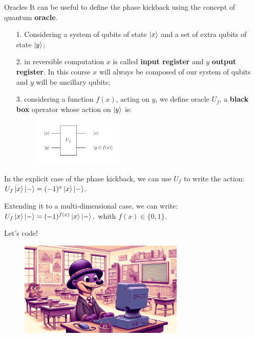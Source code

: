 \documentclass[aspectratio=169, 8pt, xcolor={svgnames}, hyperref={linkcolor=black}]{beamer}
\begin{document}
\begin{frame}{Oracles}
It can be useful to define the phase kickback using the concept of quantum \textbf{oracle}.

\begin{itemize}[noitemsep]
\item[1.] Considering a system of qubits of state $\ket{x}$ and a set of extra qubits of state $\ket{y}$; \pause
\item[2.] in reversible computation $x$ is called \textbf{input register} and $y$ \textbf{output register}. In this 
course $x$ will always be composed of our system of qubits and $y$ will be ancillary qubits; \pause
\item[3.] considering a function $f(x)$, acting on $y$, we define 
oracle $U_f$, a \textbf{black box} operator whose action on $\ket{y}$ is:
\begin{figure}
   \includegraphics[width=0.4\textwidth]{figures/oracle.pdf}
\end{figure}
\pause
\end{itemize}
In the explicit case of the phase kickback, we can use $U_f$ to write the action: $U_f \ket{x}\ket{-} = (-1)^{x}\ket{x}\ket{-}.$\pause

Extending it to a multi-dimensional case, we can write: $U_f \ket{x}\ket{-} = (-1)^{f(x)}\ket{x}\ket{-},$ whith $f(x) \in \{0,1\}$.
\end{frame}

\begin{frame}
\centering
\Huge Let's code!
\begin{figure}
   \includegraphics[width=0.7\textwidth]{figures/hands_on.png}
\end{figure}
\end{frame}
\end{document}
